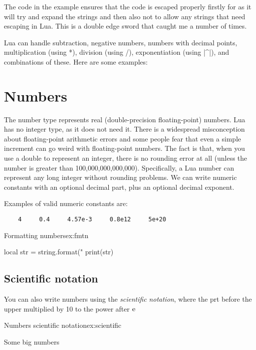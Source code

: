 The code in the example ensures that the code is escaped properly firstly for \tex as it will try and expand the
strings and then also not to allow any strings that need escaping in Lua. This is a double edge sword that caught me a number of times.


Lua can handle subtraction, negative numbers, numbers with decimal points, multiplication (using *),
division (using /), exponentiation (using |^|), and combinations of these. Here are some examples:


\section{Numbers}

The number type represents real (double-precision floating-point) numbers. Lua has no integer type, as it does not need it. There is a widespread misconception about floating-point arithmetic errors and some people fear that even a simple increment can go weird with floating-point numbers. The fact is that, when you use a double to represent an integer, there is no rounding error at all (unless the number is greater than 100,000,000,000,000). Specifically, a Lua number can represent any long integer without rounding problems.
We can write numeric constants with an optional decimal part, plus an optional decimal exponent. 

Examples of valid numeric constants are:
\begin{verbatim}
    4     0.4     4.57e-3     0.8e12     5e+20
\end{verbatim}

\begin{texexample}{Formatting numbers}{ex:fmtn}
\begin{luacode}
local str = string.format("%
print(str)
\end{luacode}
\end{texexample}



\subsection{Scientific notation}

You can also write numbers using the \textit{scientific notation}, where the prt before the upper multiplied by 10 to the power after $\textup{e}$

\begin{texexample}{Numbers scientific notation}{ex:scientific}

Some big numbers 

\end{texexample}


